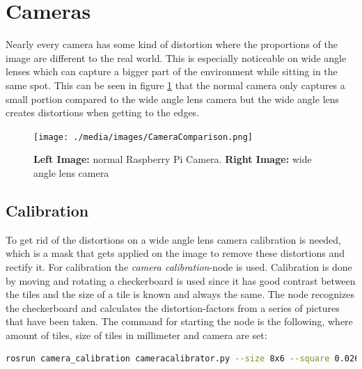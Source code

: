 \section{Cameras\authorA}
Nearly every camera has some kind of distortion where the proportions of the image are different to the real world. This is especially noticeable on wide angle lenses which can capture a bigger part of the environment while sitting in the same spot. This can be seen in figure \ref{cameracomparison} that the normal camera only captures a small portion compared to the wide angle lens camera but the wide angle lens creates distortions when getting to the edges.
\begin{figure}[h]
	\centering
	\texttt{[image: ./media/images/CameraComparison.png]}
  	\caption{\textbf{Left Image:} normal Raspberry Pi Camera. \textbf{Right Image:} wide angle lens camera}
  	\label{cameracomparison}
\end{figure}

\subsection{Calibration}
To get rid of the distortions on a wide angle lens camera calibration is needed, which is a mask that gets applied on the image to remove these distortions and rectify it.
For calibration the \textit{camera calibration}-node is used.  Calibration is done by moving and rotating a checkerboard is used since it has good contrast between the tiles and the size of a tile is known and always the same. The node recognizes the checkerboard and calculates the distortion-factors from a series of pictures that have been taken.\newline
The command for starting the node is the following, where amount of tiles, size of tiles in millimeter and camera are set:\newline
\begin{lstlisting}[language=BASH,caption={Start Calibration Node}]
rosrun camera_calibration cameracalibrator.py --size 8x6 --square 0.026 --no-service-check image:=/camera/image_raw camera:=/camera
\end{lstlisting}

